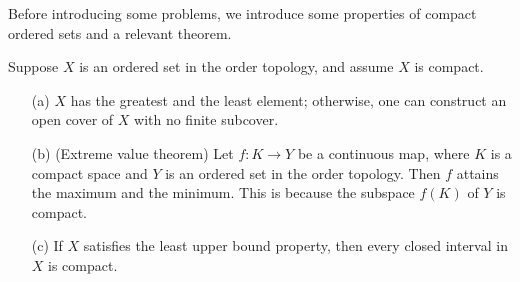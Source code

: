 Before introducing some problems, we introduce some properties of compact ordered sets and a relevant theorem.
\begin{rmk}
    Suppose $X$ is an ordered set in the order topology, and assume $X$ is compact.
    \begin{enumerate}
        \item[(a)] $X$ has the greatest and the least element; otherwise, one can construct an open cover of $X$ with no finite subcover.
        \item[(b)] (Extreme value theorem) Let $f: K\rightarrow Y$ be a continuous map, where $K$ is a compact space and $Y$ is an ordered set in the order topology. Then $f$ attains the maximum and the minimum. This is because the subspace $f(K)$ of $Y$ is compact.
        \item[(c)] If $X$ satisfies the least upper bound property, then every closed interval in $X$ is compact.
    \end{enumerate}
\end{rmk}

